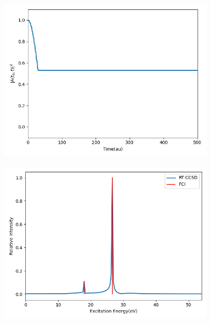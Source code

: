 \begin{figure}
\begin{subfigure}{0.47\textwidth}
         \includegraphics[width=\textwidth]{ch4/Figs/10-3.png}
     \end{subfigure}
     \hfill
     \begin{subfigure}{0.47\textwidth}
         \centering
         \includegraphics[width=\textwidth]{ch4/Figs/10-4.png}
     \end{subfigure}
      \vfill
     \begin{subfigure}{0.47\textwidth}
         \centering

\end{subfigure}
\end{figure}
